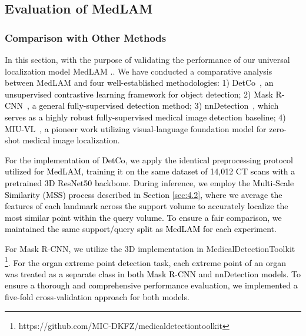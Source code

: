 \documentclass[times,twocolumn,final]{elsarticle}
\begin{document}
\subsection{Evaluation of MedLAM}
\subsubsection{Comparison with Other Methods}
\label{sec:4.4.1}









In this section, with the purpose of validating the performance of our universal localization model MedLAM \textcolor{black}{.}. We have conducted a comparative analysis between MedLAM and \textcolor{black}{four well-established methodologies: 1) DetCo~\cite{xie2021detco}, an unsupervised contrastive learning framework for object detection; 2) Mask R-CNN~\cite{he2017mask}, a general fully-supervised detection method; 3) nnDetection~\cite{baumgartner2021nndetection}, which serves as a highly robust fully-supervised medical image detection baseline; 4) MIU-VL~\cite{qin2023medical}, a pioneer work utilizing visual-language foundation model for zero-shot medical image localization.}
\par
\textcolor{black}{For the implementation of DetCo, we apply the identical preprocessing protocol utilized for MedLAM, training it on the same dataset of 14,012 CT scans with a pretrained 3D ResNet50 backbone\cite{feichtenhofer2019slowfast}. During inference, we employ the Multi-Scale Similarity (MSS) process described in Section \ref{sec:4.2}, where we average the features of each landmark across the support volume to accurately localize the most similar point within the query volume. To ensure a fair comparison, we maintained the same support/query split as MedLAM for each experiment.} 
\par
For Mask R-CNN, we utilize the 3D implementation in MedicalDetectionToolkit\cite{jaeger2020retina} \footnote{https://github.com/MIC-DKFZ/medicaldetectiontoolkit}. \textcolor{black}{For the organ extreme point detection task, each extreme point of an organ was treated as a separate class in both Mask R-CNN and nnDetection models. To ensure a thorough and comprehensive performance evaluation, we implemented a five-fold cross-validation approach for both models.} 
\end{document}
